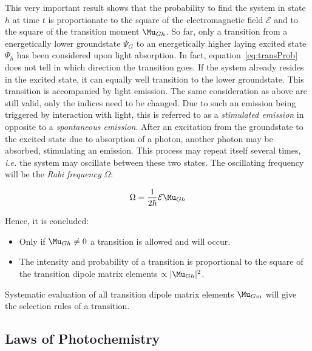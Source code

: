 			This very important result shows that the probability to find the system in state $h$ at time $t$ is proportionate to the square of the electromagnetic field $\mathcal{E}$ and to the square of the transition moment $\Mu_{Gh}$. So far, only a transition from a energetically lower groundstate $\Psi_G$ to an energetically higher laying excited state $\Psi_h$ has been considered upon light absorption. In fact, equation~\ref{eq:transProb} does not tell in which direction the transition goes. If the system already resides in the excited state, it can equally well transition to the lower groundstate. This transition is accompanied by light emission. The same consideration as above are still valid, only the indices need to be changed. Due to such an emission being triggered by interaction with light, this is referred to as a \emph{stimulated emission} in opposite to a \emph{spontaneous emission}. After an excitation from the groundstate to the excited state due to absorption of a photon, another photon may be absorbed, stimulating an emission. This process may repeat itself several times, \textit{i.e.} the system may oscillate between these two states. The oscillating frequency will be the \emph{Rabi frequency} $\Omega$:%

			\begin{equation}
				\Omega = \frac{1}{2\hbar} \mathcal{E}\Mu_{Gh}
			\end{equation}
			
			 Hence, it is concluded:

			\begin{itemize}
				\item Only if $\Mu_{Gh} \neq 0$ a transition is allowed and will occur. \\
				\item The intensity and probability of a transition is proportional to the square of the transition dipole matrix elements $\propto |\Mu_{Gh}|^2$.
			\end{itemize}
 
			Systematic evaluation of all transition dipole matrix elements $\Mu_{Gm}$ will give the selection rules of a transition. 


		\subsection{Laws of Photochemistry}

